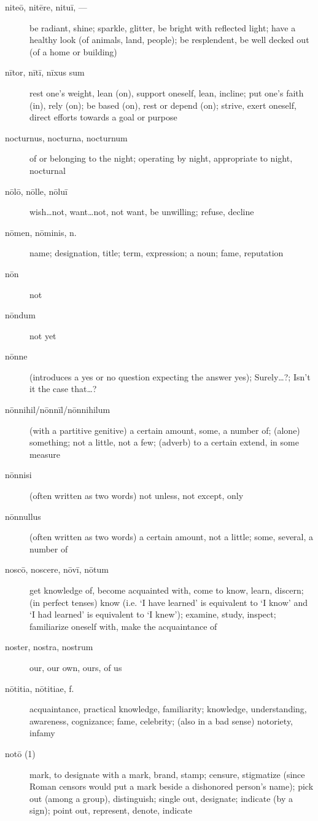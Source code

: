 \begin{description}
    \item[niteō, nitēre, nituī, ---] be radiant, shine; sparkle, glitter, be bright with reflected light; have a healthy look (of animals, land, people); be resplendent, be well decked out (of a home or building)
    \item[nītor, nītī, nīxus sum] rest one's weight, lean (on), support oneself, lean, incline; put one's faith (in), rely (on); be based (on), rest or depend (on); strive, exert oneself, direct efforts towards a goal or purpose
    \item[nocturnus, nocturna, nocturnum] of or belonging to the night; operating by night, appropriate to night, nocturnal
    \item[nōlō, nōlle, nōluī] wish\dots not, want\dots not, not want, be unwilling; refuse, decline
    \item[nōmen, nōminis, n.] name; designation, title; term, expression; a noun; fame, reputation
    \item[nōn] not
    \item[nōndum] not yet
    \item[nōnne] (introduces a yes or no question expecting the answer yes); Surely\dots ?; Isn't it the case that\dots ?
    \item[nōnnihil/nōnnīl/nōnnihilum] (with a partitive genitive) a certain amount, some, a number of; (alone) something; not a little, not a few; (adverb) to a certain extend, in some measure
    \item[nōnnisi] (often written as two words) not unless, not except, only
    \item[nōnnullus] (often written as two words) a certain amount, not a little; some, several, a number of
    \item[noscō, noscere, nōvī, nōtum] get knowledge of, become acquainted with, come to know, learn, discern; (in perfect tenses) know (i.e. `I have learned' is equivalent to `I know' and `I had learned' is equivalent to `I knew'); examine, study, inspect; familiarize oneself with, make the acquaintance of
    \item[noster, nostra, nostrum] our, our own, ours, of us
    \item[nōtitia, nōtitiae, f.] acquaintance, practical knowledge, familiarity; knowledge, understanding, awareness, cognizance; fame, celebrity; (also in a bad sense) notoriety, infamy
    \item[notō (1)] mark, to designate with a mark, brand, stamp; censure, stigmatize (since Roman censors would put a mark beside a dishonored person's name); pick out (among a group), distinguish; single out, designate; indicate (by a sign); point out, represent, denote, indicate

\end{description}
